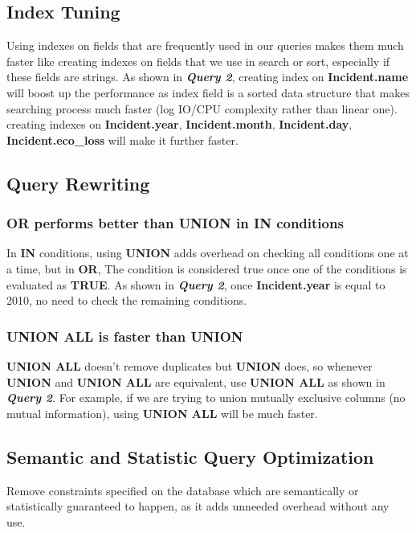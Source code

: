 \subsection{Index Tuning}
Using indexes on fields that are frequently used in our queries makes them much faster like creating indexes on fields that we use in search or sort, especially if these fields are strings. As shown in \textbf{\textit{Query 2}}, creating index on \textbf{Incident.name} will boost up the performance as index field is a sorted data structure that makes searching process much faster (log IO/CPU complexity rather than linear one). creating indexes on \textbf{Incident.year}, \textbf{Incident.month}, \textbf{Incident.day}, \textbf{Incident.eco\_loss} will make it further faster.

\subsection{Query Rewriting}
\subsubsection{OR performs better than UNION in IN conditions}
In \textbf{IN} conditions, using \textbf{UNION} adds overhead on checking all conditions one at a time, but in \textbf{OR}, The condition is considered true once one of the conditions is evaluated as \textbf{TRUE}.
As shown in \textbf{\textit{Query 2}}, once \textbf{Incident.year} is equal to 2010, no need to check the remaining conditions.

\subsubsection{UNION ALL is faster than UNION}
\textbf{UNION ALL} doesn't remove duplicates but \textbf{UNION} does, so whenever \textbf{UNION} and \textbf{UNION ALL} are equivalent, use \textbf{UNION ALL} as shown in \textbf{\textit{Query 2}}. For example, if we are trying to union mutually exclusive columns (no mutual information), using \textbf{UNION ALL} will be much faster.

\subsection{Semantic and Statistic Query Optimization}
Remove constraints specified on the database which are semantically or statistically guaranteed to happen, as it adds unneeded overhead without any use.

